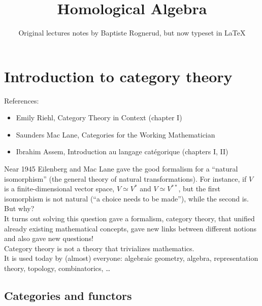\documentclass{article}
\title{Homological Algebra}
\author{Original lectures notes by Baptiste Rognerud, but now typeset in \LaTeX}
\date{}
\newcommand{\warning}{\faExclamationTriangle \hspace{3pt}}
\theoremstyle{plain}
\theoremstyle{definition}
\theoremstyle{remark}
\begin{document}
\maketitle

\section{Introduction to category theory}

References:
\begin{itemize}
    \item Emily Riehl, Category Theory in Context (chapter I)
    \item Saunders Mac Lane, Categories for the Working Mathematician
    \item Ibrahim Assem, Introduction au langage catégorique (chapters I, II)
\end{itemize}

\faChevronRight \space Near 1945 Eilenberg and Mac Lane gave the good formalism for a ``natural isomorphism'' (the general theory of natural transformations). For instance, if $V$ is a finite-dimensional vector space, $V \simeq V^*$ and $V \simeq V^{**}$, but the first isomorphism is not natural (``a choice needs to be made''), while the second is. But why? \\
It turns out solving this question gave a formalism, category theory, that unified already existing mathematical concepts, gave new links between different notions and also gave new questions! \\
\warning Category theory is not a theory that trivializes mathematics. \\
It is used today by (almost) everyone: algebraic geometry, algebra, representation theory, topology, combinatorics, \dots

\subsection{Categories and functors}
\end{document}
